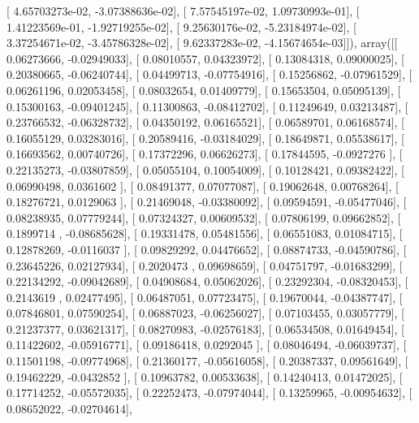 \documentclass{article}
\begin{document}
       [  4.65703273e-02,  -3.07388636e-02],
       [  7.57545197e-02,   1.09730993e-01],
       [  1.41223569e-01,  -1.92719255e-02],
       [  9.25630176e-02,  -5.23184974e-02],
       [  3.37254671e-02,  -3.45786328e-02],
       [  9.62337283e-02,  -4.15674654e-03]]), array([[ 0.06273666, -0.02949033],
       [ 0.08010557,  0.04323972],
       [ 0.13084318,  0.09000025],
       [ 0.20380665, -0.06240744],
       [ 0.04499713, -0.07754916],
       [ 0.15256862, -0.07961529],
       [ 0.06261196,  0.02053458],
       [ 0.08032654,  0.01409779],
       [ 0.15653504,  0.05095139],
       [ 0.15300163, -0.09401245],
       [ 0.11300863, -0.08412702],
       [ 0.11249649,  0.03213487],
       [ 0.23766532, -0.06328732],
       [ 0.04350192,  0.06165521],
       [ 0.06589701,  0.06168574],
       [ 0.16055129,  0.03283016],
       [ 0.20589416, -0.03184029],
       [ 0.18649871,  0.05538617],
       [ 0.16693562,  0.00740726],
       [ 0.17372296,  0.06626273],
       [ 0.17844595, -0.0927276 ],
       [ 0.22135273, -0.03807859],
       [ 0.05055104,  0.10054009],
       [ 0.10128421,  0.09382422],
       [ 0.06990498,  0.0361602 ],
       [ 0.08491377,  0.07077087],
       [ 0.19062648,  0.00768264],
       [ 0.18276721,  0.0129063 ],
       [ 0.21469048, -0.03380092],
       [ 0.09594591, -0.05477046],
       [ 0.08238935,  0.07779244],
       [ 0.07324327,  0.00609532],
       [ 0.07806199,  0.09662852],
       [ 0.1899714 , -0.08685628],
       [ 0.19331478,  0.05481556],
       [ 0.06551083,  0.01084715],
       [ 0.12878269, -0.0116037 ],
       [ 0.09829292,  0.04476652],
       [ 0.08874733, -0.04590786],
       [ 0.23645226,  0.02127934],
       [ 0.2020473 ,  0.09698659],
       [ 0.04751797, -0.01683299],
       [ 0.22134292, -0.09042689],
       [ 0.04908684,  0.05062026],
       [ 0.23292304, -0.08320453],
       [ 0.2143619 ,  0.02477495],
       [ 0.06487051,  0.07723475],
       [ 0.19670044, -0.04387747],
       [ 0.07846801,  0.07590254],
       [ 0.06887023, -0.06256027],
       [ 0.07103455,  0.03057779],
       [ 0.21237377,  0.03621317],
       [ 0.08270983, -0.02576183],
       [ 0.06534508,  0.01649454],
       [ 0.11422602, -0.05916771],
       [ 0.09186418,  0.0292045 ],
       [ 0.08046494, -0.06039737],
       [ 0.11501198, -0.09774968],
       [ 0.21360177, -0.05616058],
       [ 0.20387337,  0.09561649],
       [ 0.19462229, -0.0432852 ],
       [ 0.10963782,  0.00533638],
       [ 0.14240413,  0.01472025],
       [ 0.17714252, -0.05572035],
       [ 0.22252473, -0.07974044],
       [ 0.13259965, -0.00954632],
       [ 0.08652022, -0.02704614],
\end{document}
